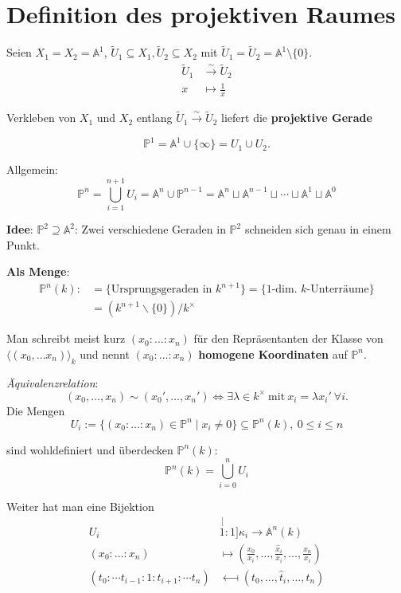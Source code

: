 
\section{Definition des projektiven Raumes}
\label{sec:def-projektiver-raum}

Seien $X_{1}=X_{2}=\mathbb{A}^{1}$, $\tilde{U}_{1}\subseteq X_{1}, \tilde{U}_{2}\subseteq X_{2}$ mit $\tilde{U}_{1} = \tilde{U}_{2} = \mathbb{A}^{1}\setminus\{0\}$.
\begin{align*}
  \tilde{U}_{1} & \overset{\sim}{\longrightarrow}\tilde{U}_{2}\\
  x & \longmapsto\frac{1}{x}
\end{align*}

Verkleben von $X_{1}$ und $X_{2}$ entlang $\tilde{U}_{1} \overset{\sim}\longrightarrow \tilde{U}_{2}$ liefert die \textbf{projektive Gerade}

\[
  \mathbb{P}^{1}=\mathbb{A}^{1}\cup\{\infty\}=U_{1}\cup U_{2}.
\]

Allgemein: 
\[
  \mathbb{P}^{n}=\bigcup_{i=1}^{n+1}U_{i}=\mathbb{A}^{n}\cup\mathbb{P}^{n-1}=\mathbb{A}^{n}\sqcup\mathbb{A}^{n-1}\sqcup\cdots\sqcup\mathbb{A}^{1}\sqcup\mathbb{A}^{0}
\]

\textbf{Idee}: $\mathbb{P}^{2}\supseteq\mathbb{A}^{2}$: Zwei verschiedene
Geraden in $\mathbb{P}^{2}$ schneiden sich genau in einem Punkt.

\textbf{Als Menge}:
\begin{align*}
  \mathbb{P}^{n}(k): & =\{\text{Ursprungsgeraden in }k^{n+1}\}=\{1\text{-dim. }k\text{-Unterräume}\}\\
                     & =(k^{n+1}\backslash\{0\})/k^{\times}
\end{align*}

Man schreibt meist kurz $(x_{0}:\ldots:x_{n})$ für den Repräsentanten der Klasse von $\langle(x_{0},\ldots x_{n})\rangle_{k}$ und nennt $(x_{0}:\ldots:x_{n})$ \textbf{homogene Koordinaten} auf $\mathbb{P}^{n}$.


\emph{Äquivalenzrelation}: 
\[
  (x_{0},\ldots,x_{n})\sim(x_{0}',\ldots,x_{n}')\Leftrightarrow\exists\lambda\in k^{\times}\ \text{mit}\ x_{i}=\lambda x_{i}'\ \forall i.
\]
Die Mengen
\[
  U_{i}:=\{(x_{0}:\ldots:x_{n})\in\mathbb{P}^{n}\mid x_{i}\neq0\}\subseteq\mathbb{P}^{n}(k),\ 0\leq i\leq n
\]

sind wohldefiniert und überdecken $\mathbb{P}^{n}(k)$:
\[
  \mathbb{P}^{n}(k)=\bigcup_{i=0}^{n}U_{i}
\]

Weiter hat man eine Bijektion
\begin{align*}
  U_{i} & \stackrel[1:1]{\kappa_{i}}{\longrightarrow}\mathbb{A}^{n}(k)\\
  (x_{0}:\ldots:x_{n}) & \longmapsto\left(\frac{x_{0}}{x_{i}},\ldots,\frac{\hat{x}_{i}}{x_{i}},\ldots,\frac{x_{n}}{x_{i}}\right)\\
  (t_{0}:\cdots t_{i-1}:1:t_{i+1}:\cdots t_{n}) & \longmapsfrom(t_{0},\ldots,\hat{t}_{i},\ldots,t_{n})
\end{align*}

